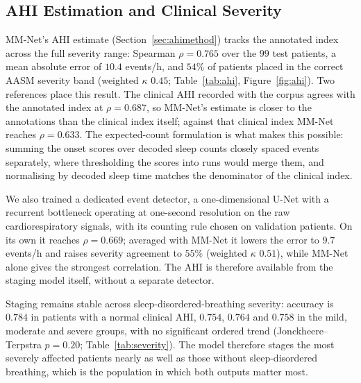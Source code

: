 \documentclass{ieeeaccess}
\newcommand{\mmRho}{0.765}
\begin{document}
\subsection{AHI Estimation and Clinical Severity}
\label{sec:ahi}
MM-Net's AHI estimate (Section~\ref{sec:ahimethod}) tracks the annotated index across the full
severity range: Spearman $\rho=\mmRho$ over the $99$ test patients, a mean absolute error of
$10.4$ events/h, and $54\%$ of patients placed in the correct AASM severity band (weighted
$\kappa$ $0.45$; Table~\ref{tab:ahi}, Figure~\ref{fig:ahi}). Two references place this result.
The clinical AHI recorded with the corpus agrees with the annotated index at $\rho=0.687$, so
MM-Net's estimate is closer to the annotations than the clinical index itself; against that
clinical index MM-Net reaches $\rho=0.633$. The expected-count formulation is what makes this
possible: summing the onset scores over decoded sleep counts closely spaced events separately,
where thresholding the scores into runs would merge them, and normalising by decoded sleep time
matches the denominator of the clinical index.

We also trained a dedicated event detector, a one-dimensional U-Net with a recurrent
bottleneck operating at one-second resolution on the raw cardiorespiratory signals, with its
counting rule chosen on validation patients. On its own it reaches $\rho=0.669$; averaged with
MM-Net it lowers the error to $9.7$ events/h and raises severity agreement to $55\%$ (weighted
$\kappa$ $0.51$), while MM-Net alone gives the strongest correlation. The AHI is therefore
available from the staging model itself, without a separate detector.

Staging remains stable across sleep-disordered-breathing severity: accuracy is $0.784$ in
patients with a normal clinical AHI, $0.754$, $0.764$ and $0.758$ in the mild, moderate and
severe groups, with no significant ordered trend (Jonckheere--Terpstra $p=0.20$;
Table~\ref{tab:severity}). The model therefore stages the most severely affected patients
nearly as well as those without sleep-disordered breathing, which is the population in which
both outputs matter most.
\end{document}
